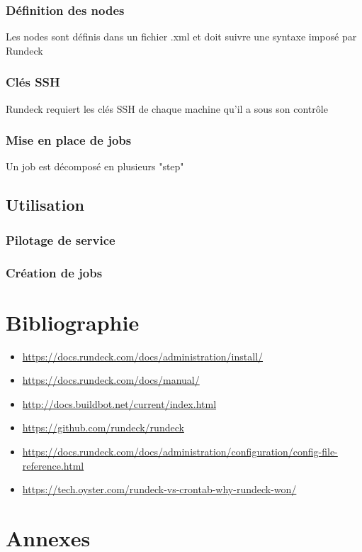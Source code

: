 \documentclass[12pt]{article}
\begin{document}
\subsubsection{Définition des nodes}
Les nodes sont définis dans un fichier .xml et doit suivre une syntaxe imposé par Rundeck

\subsubsection{Clés SSH}
Rundeck requiert les clés SSH de chaque machine qu'il a sous son contrôle

\subsubsection{Mise en place de jobs}
Un job est décomposé en plusieurs "step"

\subsection{Utilisation}
\subsubsection{Pilotage de service}
\subsubsection{Création de jobs}

\newpage
\section{Bibliographie}

\begin{itemize}
    \item \url{https://docs.rundeck.com/docs/administration/install/}
    \item \url{https://docs.rundeck.com/docs/manual/}
    \item \url{http://docs.buildbot.net/current/index.html}
    \item \url{https://github.com/rundeck/rundeck}
    \item \url{https://docs.rundeck.com/docs/administration/configuration/config-file-reference.html}
    \item \url{https://tech.oyster.com/rundeck-vs-crontab-why-rundeck-won/}
\end{itemize}

\newpage
\section{Annexes}
\end{document}
